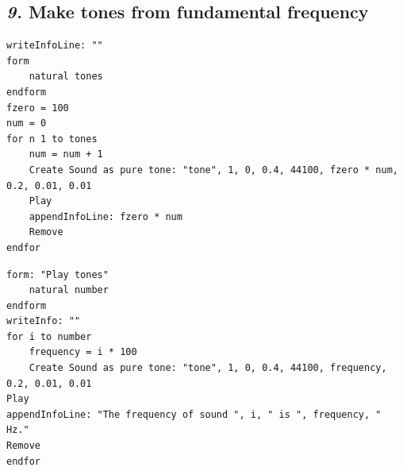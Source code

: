 \documentclass[12pt, english]{article}
\begin{document}
\subsection*{\emph{9.} Make tones from fundamental frequency}

\begin{lstlisting}
writeInfoLine: ""
form
	natural tones
endform
fzero = 100
num = 0
for n 1 to tones
	num = num + 1
	Create Sound as pure tone: "tone", 1, 0, 0.4, 44100, fzero * num, 0.2, 0.01, 0.01
	Play
	appendInfoLine: fzero * num
	Remove
endfor
\end{lstlisting}

\begin{lstlisting}[rulesepcolor=\color{blue}]
form: "Play tones"
	natural number
endform
writeInfo: ""
for i to number
	frequency = i * 100
	Create Sound as pure tone: "tone", 1, 0, 0.4, 44100, frequency, 0.2, 0.01, 0.01
Play
appendInfoLine: "The frequency of sound ", i, " is ", frequency, " Hz."
Remove
endfor
\end{lstlisting}
\end{document}
